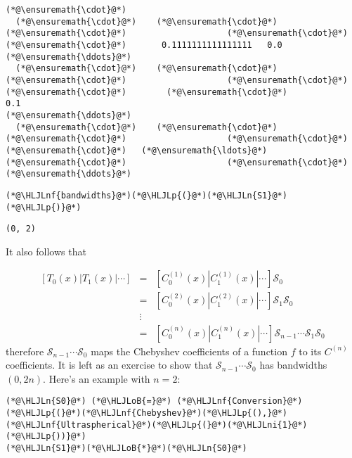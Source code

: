 \documentclass[12pt,landscape]{article}
\newcommand{\HLJLn}[1]{#1}
\newcommand{\HLJLnf}[1]{\textcolor[RGB]{66,102,213}{#1}}
\newcommand{\HLJLni}[1]{\textcolor[RGB]{59,151,46}{#1}}
\newcommand{\HLJLoB}[1]{\textcolor[RGB]{102,102,102}{\textbf{#1}}}
\newcommand{\HLJLp}[1]{#1}
\begin{document}
{\begin{lstlisting}
(*@\ensuremath{\cdot}@*)
  (*@\ensuremath{\cdot}@*)    (*@\ensuremath{\cdot}@*)     (*@\ensuremath{\cdot}@*)                    (*@\ensuremath{\cdot}@*)      (*@\ensuremath{\cdot}@*)       0.1111111111111111   0.0  
(*@\ensuremath{\ddots}@*)
  (*@\ensuremath{\cdot}@*)    (*@\ensuremath{\cdot}@*)     (*@\ensuremath{\cdot}@*)                    (*@\ensuremath{\cdot}@*)      (*@\ensuremath{\cdot}@*)        (*@\ensuremath{\cdot}@*)                   0.1  
(*@\ensuremath{\ddots}@*)
  (*@\ensuremath{\cdot}@*)    (*@\ensuremath{\cdot}@*)     (*@\ensuremath{\cdot}@*)                    (*@\ensuremath{\cdot}@*)      (*@\ensuremath{\cdot}@*)   (*@\ensuremath{\ldots}@*)    (*@\ensuremath{\cdot}@*)                    (*@\ensuremath{\cdot}@*)   
(*@\ensuremath{\ddots}@*)
\end{lstlisting}


\begin{lstlisting}
(*@\HLJLnf{bandwidths}@*)(*@\HLJLp{(}@*)(*@\HLJLn{S1}@*)(*@\HLJLp{)}@*)
\end{lstlisting}

\begin{lstlisting}
(0, 2)
\end{lstlisting}


It also follows that 


\begin{eqnarray*}
\left[ T_0(x) | T_1(x) | \cdots  \right] &=&  \left[ C^{(1)}_0(x) | C^{(1)}_1(x) | \cdots  \right]\mathcal{S}_0 \\
&=& \left[ C^{(2)}_0(x) | C^{(2)}_1(x) | \cdots  \right]\mathcal{S}_1\mathcal{S}_0 \\
&\vdots &  \\
& = & \left[ C^{(n)}_0(x) | C^{(n)}_1(x) | \cdots  \right]\mathcal{S}_{n-1}\cdots\mathcal{S}_1\mathcal{S}_0
\end{eqnarray*}
therefore $\mathcal{S}_{n-1}\cdots\mathcal{S}_0$ maps the Chebyshev coefficients of a function $f$ to its $C^{(n)}$ coefficients.  It is left as an exercise to show that $\mathcal{S}_{n-1}\cdots\mathcal{S}_0$ has bandwidths $(0,2n)$.  Here's an example with $n = 2$:


\begin{lstlisting}
(*@\HLJLn{S0}@*) (*@\HLJLoB{=}@*) (*@\HLJLnf{Conversion}@*)(*@\HLJLp{(}@*)(*@\HLJLnf{Chebyshev}@*)(*@\HLJLp{(),}@*)(*@\HLJLnf{Ultraspherical}@*)(*@\HLJLp{(}@*)(*@\HLJLni{1}@*)(*@\HLJLp{))}@*)
(*@\HLJLn{S1}@*)(*@\HLJLoB{*}@*)(*@\HLJLn{S0}@*)
\end{lstlisting}

}
\end{document}
